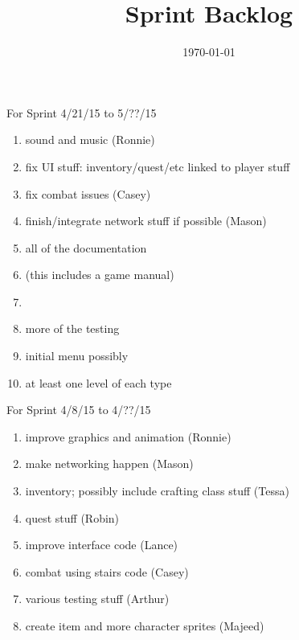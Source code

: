 \documentclass[12pt]{article}
\title{Sprint Backlog}
\date{\today}
\begin{document}
\maketitle



\begin{section}{For Sprint 4/21/15 to 5/??/15}
\begin{enumerate}

\item sound and music (Ronnie)
\item fix UI stuff: inventory/quest/etc linked to player stuff
\item fix combat issues (Casey)
\item finish/integrate network stuff if possible (Mason)
\item all of the documentation
\item (this includes a game manual)
\item 
\item more of the testing
\item initial menu possibly
\item at least one level of each type


\end{enumerate}
\end{section}






\begin{section}{For Sprint 4/8/15 to 4/??/15}
\begin{enumerate}


\item improve graphics and animation (Ronnie)
\item make networking happen (Mason) 
\item inventory; possibly include crafting class stuff (Tessa) 
\item quest stuff (Robin)
\item improve interface code (Lance)
\item combat using stairs code (Casey)
\item various testing stuff (Arthur)
\item create item and more character sprites (Majeed)


\end{enumerate}
\end{section}
\end{document}
